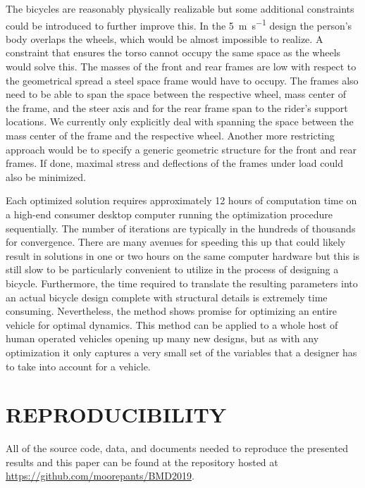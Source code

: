 \documentclass{bmd2019p}
\begin{document}
The bicycles are reasonably physically realizable but some additional
constraints could be introduced to further improve this. In the
5~\si{\meter\per\second} design the person's body overlaps the wheels, which
would be almost impossible to realize. A constraint that ensures the torso
cannot occupy the same space as the wheels would solve this. The masses of the
front and rear frames are low with respect to the geometrical spread a steel
space frame would have to occupy. The frames also need to be able to span the
space between the respective wheel, mass center of the frame, and the steer
axis and for the rear frame span to the rider's support locations. We currently
only explicitly deal with spanning the space between the mass center of the
frame and the respective wheel. Another more restricting approach would be to
specify a generic geometric structure for the front and rear frames. If done,
maximal stress and deflections of the frames under load could also be
minimized.

Each optimized solution requires approximately 12 hours of computation time on
a high-end consumer desktop computer running the optimization procedure
sequentially. The number of iterations are typically in the hundreds of
thousands for convergence. There are many avenues for speeding this up that
could likely result in solutions in one or two hours on the same computer
hardware but this is still slow to be particularly convenient to utilize in the
process of designing a bicycle. Furthermore, the time required to translate the
resulting parameters into an actual bicycle design complete with structural
details is extremely time consuming. Nevertheless, the method shows promise for
optimizing an entire vehicle for optimal dynamics. This method can be applied
to a whole host of human operated vehicles opening up many new designs, but as
with any optimization it only captures a very small set of the variables that a
designer has to take into account for a vehicle.

\section{REPRODUCIBILITY}
%
All of the source code, data, and documents needed to reproduce the presented
results and this paper can be found at the repository hosted at
\url{https://github.com/moorepants/BMD2019}.



\end{document}
